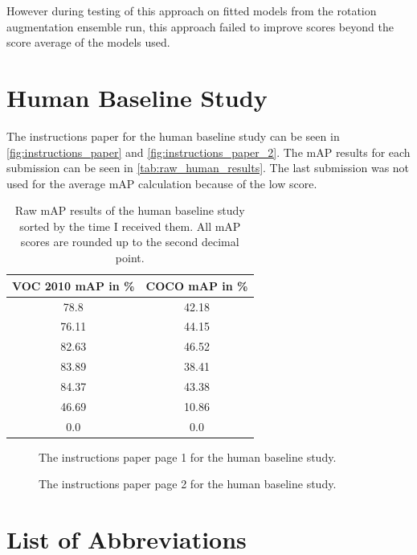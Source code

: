 \documentclass[10pt]{book}
\newcommand{\figureref}[1]{\autoref{#1}}
\begin{document}
However during testing of this approach on fitted models from the rotation augmentation ensemble run, this approach failed to improve scores beyond the score average of the models used.

\section{Human Baseline Study}
\label{sec:instructions_paper}

The instructions paper for the human baseline study can be seen in \figureref{fig:instructions_paper} and \figureref{fig:instructions_paper_2}. The \ac{mAP} results for each submission can be seen in \autoref{tab:raw_human_results}. The last submission was not used for the average \ac{mAP} calculation because of the low score.

\begin{table}
  \begin{tabular}{ c c }
   VOC 2010 \ac{mAP} in \% & COCO \ac{mAP} in \% \\ 
   \hline
   78.8 & 42.18 \\
   76.11 & 44.15 \\
   82.63 & 46.52 \\
   83.89 & 38.41 \\
   84.37 & 43.38 \\
   46.69 & 10.86 \\
   0.0 & 0.0 \\
   \hline
  \end{tabular}
  \caption{\label{tab:raw_human_results}Raw \ac{mAP} results of the human baseline study sorted by the time I received them. All \ac{mAP} scores are rounded up to the second decimal point.}
\end{table}

\begin{figure}
  \caption{The instructions paper page 1 for the human baseline study.}
  \label{fig:instructions_paper}
\end{figure}

\begin{figure}
  \caption{The instructions paper page 2 for the human baseline study.}
  \label{fig:instructions_paper_2}
\end{figure}

\section{List of Abbreviations}
\end{document}
